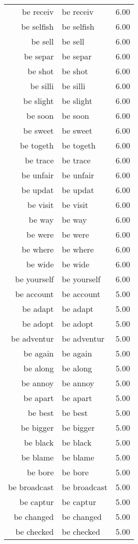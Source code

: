 \begin{table}[ht]
\begin{tabular}{rlr}
  be receiv & be receiv & 6.00 \\ 
  be selfish & be selfish & 6.00 \\ 
  be sell & be sell & 6.00 \\ 
  be separ & be separ & 6.00 \\ 
  be shot & be shot & 6.00 \\ 
  be silli & be silli & 6.00 \\ 
  be slight & be slight & 6.00 \\ 
  be soon & be soon & 6.00 \\ 
  be sweet & be sweet & 6.00 \\ 
  be togeth & be togeth & 6.00 \\ 
  be trace & be trace & 6.00 \\ 
  be unfair & be unfair & 6.00 \\ 
  be updat & be updat & 6.00 \\ 
  be visit & be visit & 6.00 \\ 
  be way & be way & 6.00 \\ 
  be were & be were & 6.00 \\ 
  be where & be where & 6.00 \\ 
  be wide & be wide & 6.00 \\ 
  be yourself & be yourself & 6.00 \\ 
  be account & be account & 5.00 \\ 
  be adapt & be adapt & 5.00 \\ 
  be adopt & be adopt & 5.00 \\ 
  be adventur & be adventur & 5.00 \\ 
  be again & be again & 5.00 \\ 
  be along & be along & 5.00 \\ 
  be annoy & be annoy & 5.00 \\ 
  be apart & be apart & 5.00 \\ 
  be best & be best & 5.00 \\ 
  be bigger & be bigger & 5.00 \\ 
  be black & be black & 5.00 \\ 
  be blame & be blame & 5.00 \\ 
  be bore & be bore & 5.00 \\ 
  be broadcast & be broadcast & 5.00 \\ 
  be captur & be captur & 5.00 \\ 
  be changed & be changed & 5.00 \\ 
  be checked & be checked & 5.00 \\ 

\end{tabular}
\end{table}
